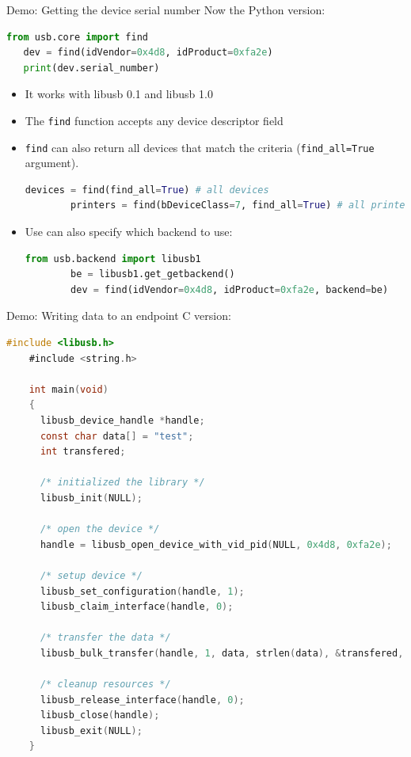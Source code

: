 \documentclass[pdf]{beamer}
\begin{document}
\begin{frame}[fragile]{Demo: Getting the device serial number}
  \tiny
  \pause
  Now the Python version:
  \pause
  \begin{lstlisting}[language=Python]
   from usb.core import find
   dev = find(idVendor=0x4d8, idProduct=0xfa2e)
   print(dev.serial_number)
  \end{lstlisting}

  \begin{itemize}
    \tiny
    \pause
    \item It works with libusb 0.1 and libusb 1.0
    \pause
    \item The \texttt{find} function accepts any device descriptor field
    \pause
    \item \texttt{find} can also return all devices that match the criteria
      (\texttt{find\_all=True} argument).
      \begin{lstlisting}[language=Python]
        devices = find(find_all=True) # all devices
        printers = find(bDeviceClass=7, find_all=True) # all printers
      \end{lstlisting}
    \pause
    \item Use can also specify which backend to use:
      \begin{lstlisting}[language=Python]
        from usb.backend import libusb1
        be = libusb1.get_getbackend()
        dev = find(idVendor=0x4d8, idProduct=0xfa2e, backend=be)
      \end{lstlisting}
  \end{itemize}
\end{frame}

\begin{frame}[fragile]{Demo: Writing data to an endpoint}
  \tiny
  \pause
  C version:
  \pause
  \begin{lstlisting}[language=C]
    #include <libusb.h>
    #include <string.h>

    int main(void)
    {
      libusb_device_handle *handle;
      const char data[] = "test";
      int transfered;

      /* initialized the library */
      libusb_init(NULL);

      /* open the device */
      handle = libusb_open_device_with_vid_pid(NULL, 0x4d8, 0xfa2e);

      /* setup device */
      libusb_set_configuration(handle, 1);
      libusb_claim_interface(handle, 0);

      /* transfer the data */
      libusb_bulk_transfer(handle, 1, data, strlen(data), &transfered, 1000);

      /* cleanup resources */
      libusb_release_interface(handle, 0);
      libusb_close(handle);
      libusb_exit(NULL);
    }
  \end{lstlisting}
\end{frame}
\end{document}
